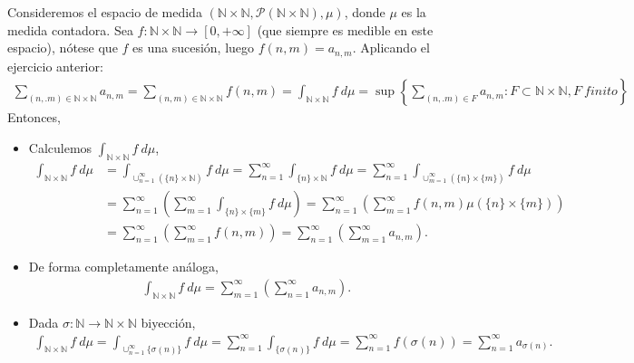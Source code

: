\begin{ejemplo}
Consideremos el espacio de medida $(\mathbb{N} \times \mathbb{N}, \mathcal{P}(\mathbb{N} \times \mathbb{N}), \mu)$, donde $\mu$ es la medida contadora. Sea $f: \mathbb{N} \times \mathbb{N} \longrightarrow [0,+\infty]$ (que siempre es medible en este espacio), nótese que $f$ es una sucesión, luego $f(n,m) = a_{n,m}$. Aplicando el ejercicio anterior:
\begin{align*}
    \sum_{(n,.m) \in \mathbb{N} \times \mathbb{N}}{a_{n,m}} = \sum_{(n,m) \in \mathbb{N} \times \mathbb{N}}{f(n,m)} = \int_{\mathbb{N} \times \mathbb{N}}{f \ d\mu} = \sup{\left\{\sum_{(n,.m) \in F}{a_{n,m}} : F \subset \mathbb{N} \times \mathbb{N}, F \ finito \right\}}
\end{align*}
Entonces,
\begin{itemize}
    \item Calculemos $\int_{\mathbb{N} \times \mathbb{N}}{f \ d\mu}$,
    \begin{align*}
        \int_{\mathbb{N} \times \mathbb{N}}{f \ d\mu} &= \int_{\cup_{n=1}^{\infty}{(\{n\}\times\mathbb{N})}}{f \ d\mu} = \sum_{n=1}^{\infty}{\int_{\{n\}\times\mathbb{N}}}{f \ d\mu} = \sum_{n=1}^{\infty}{\int_{\cup_{m=1}^{\infty}{(\{n\}\times\{m\})}}}{f \ d\mu}\\
        &= \sum_{n=1}^{\infty}{\left( \sum_{m=1}^{\infty}{\int_{\{n\}\times\{m\}}}{f \ d\mu}\right)} = \sum_{n=1}^{\infty}{\left( \sum_{m=1}^{\infty}{f(n,m)\mu(\{n\}\times\{m\})}\right)}\\
        &= \sum_{n=1}^{\infty}{\left( \sum_{m=1}^{\infty}{f(n,m)}\right)} = \sum_{n=1}^{\infty}{\left( \sum_{m=1}^{\infty}{a_{n,m}}\right)}.
    \end{align*}
    \item De forma completamente análoga,
    \begin{align*}
        \int_{\mathbb{N} \times \mathbb{N}}{f \ d\mu} = \sum_{m=1}^{\infty}{\left( \sum_{n=1}^{\infty}{a_{n,m}}\right)}.
    \end{align*}
    \item Dada $\sigma: \mathbb{N} \longrightarrow \mathbb{N} \times \mathbb{N}$ biyección,
    \begin{align*}
        \int_{\mathbb{N} \times \mathbb{N}}{f \ d\mu} = \int_{\cup_{n=1}^{\infty}{\{\sigma(n)\}}}{f \ d\mu} = \sum_{n=1}^{\infty}{\int_{\{\sigma(n)\}}}{f \ d\mu} = \sum_{n=1}^{\infty}{f(\sigma(n))} = \sum_{n=1}^{\infty}{a_{\sigma(n)}}.
    \end{align*}
\end{itemize}
\end{ejemplo}

